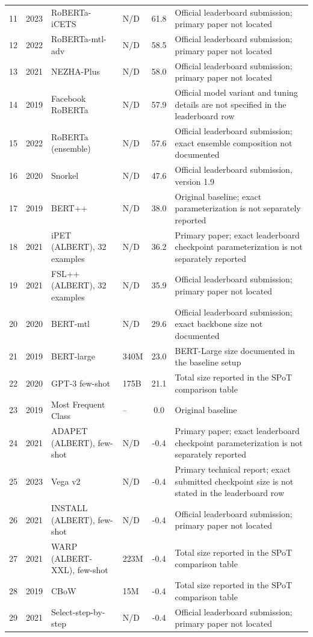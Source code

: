 \documentclass[10pt]{article}
\begin{document}
\begin{longtable}{@{}c c p{3.7cm} p{2.5cm} c p{4.3cm}@{}}
11 & 2023 & RoBERTa-iCETS & N/D & 61.8 & Official leaderboard submission; primary paper not located \\
12 & 2022 & RoBERTa-mtl-adv & N/D & 58.5 & Official leaderboard submission; primary paper not located \\
13 & 2021 & NEZHA-Plus & N/D & 58.0 & Official leaderboard submission; primary paper not located \\
14 & 2019 & Facebook RoBERTa & N/D & 57.9 & Official model variant and tuning details are not specified in the leaderboard row \cite{liu2019roberta} \\
15 & 2022 & RoBERTa (ensemble) & N/D & 57.6 & Official leaderboard submission; exact ensemble composition not documented \\
16 & 2020 & Snorkel & N/D & 47.6 & Official leaderboard submission, version 1.9 \\
17 & 2019 & BERT++ & N/D & 38.0 & Original baseline; exact parameterization is not separately reported \cite{wang2019superglue} \\
18 & 2021 & iPET (ALBERT), 32 examples & N/D & 36.2 & Primary paper; exact leaderboard checkpoint parameterization is not separately reported \cite{schick2021ipet} \\
19 & 2021 & FSL++ (ALBERT), 32 examples & N/D & 35.9 & Official leaderboard submission; primary paper not located \\
20 & 2020 & BERT-mtl & N/D & 29.6 & Official leaderboard submission; exact backbone size not documented \\
21 & 2019 & BERT-large & 340M & 23.0 & BERT-Large size documented in the baseline setup \cite{wang2019superglue,devlin2019bert} \\
22 & 2020 & GPT-3 few-shot & 175B & 21.1 & Total size reported in the SPoT comparison table \cite{brown2020gpt3,vu2022spot} \\
23 & 2019 & Most Frequent Class & -- & 0.0 & Original baseline \cite{wang2019superglue} \\
24 & 2021 & ADAPET (ALBERT), few-shot & N/D & -0.4 & Primary paper; exact leaderboard checkpoint parameterization is not separately reported \cite{tam2021adapet} \\
25 & 2023 & Vega v2 & N/D & -0.4 & Primary technical report; exact submitted checkpoint size is not stated in the leaderboard row \cite{wang2022vega} \\
26 & 2021 & INSTALL (ALBERT), few-shot & N/D & -0.4 & Official leaderboard submission; primary paper not located \\
27 & 2021 & WARP (ALBERT-XXL), few-shot & 223M & -0.4 & Total size reported in the SPoT comparison table \cite{vu2022spot} \\
28 & 2019 & CBoW & 15M & -0.4 & Total size reported in the SPoT comparison table \cite{vu2022spot} \\
29 & 2021 & Select-step-by-step & N/D & -0.4 & Official leaderboard submission; primary paper not located \\
\bottomrule
\end{longtable}
\end{document}

